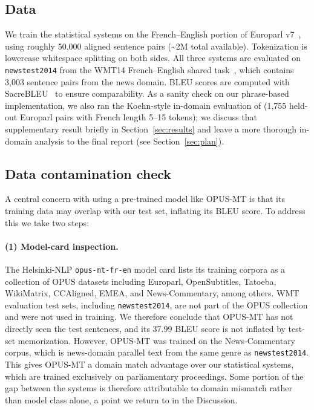 \documentclass[11pt]{article}
\begin{document}
\subsection{Data}
We train the statistical systems on the French--English portion of Europarl v7~\cite{koehn-2005-europarl}, using roughly 50{,}000 aligned sentence pairs (\textasciitilde{}2M total available). Tokenization is lowercase whitespace splitting on both sides. All three systems are evaluated on \texttt{newstest2014} from the WMT14 French--English shared task~\cite{bojar-etal-2014-findings}, which contains 3{,}003 sentence pairs from the news domain. BLEU scores are computed with SacreBLEU~\cite{post-2018-call} to ensure comparability. As a sanity check on our phrase-based implementation, we also ran the Koehn-style in-domain evaluation of \citet{koehn-etal-2003-statistical} (1{,}755 held-out Europarl pairs with French length 5--15 tokens); we discuss that supplementary result briefly in Section~\ref{sec:results} and leave a more thorough in-domain analysis to the final report (see Section~\ref{sec:plan}).
 
\subsection{Data contamination check}
\label{sec:contamination}
 
A central concern with using a pre-trained model like OPUS-MT is that its training data may overlap with our test set, inflating its BLEU score. To address this we take two steps:
 
\paragraph{(1) Model-card inspection.} The Helsinki-NLP \texttt{opus-mt-fr-en} model card lists its training corpora as a collection of OPUS datasets including Europarl, OpenSubtitles, Tatoeba, WikiMatrix, CCAligned, EMEA, and News-Commentary, among others. WMT evaluation test sets, including \texttt{newstest2014}, are not part of the OPUS collection and were not used in training. We therefore conclude that OPUS-MT has not directly seen the test sentences, and its 37.99 BLEU score is not inflated by test-set memorization. However, OPUS-MT was trained on the News-Commentary corpus, which is news-domain parallel text from the same genre as \texttt{newstest2014}. This gives OPUS-MT a domain match advantage over our statistical systems, which are trained exclusively on parliamentary proceedings. Some portion of the gap between the systems is therefore attributable to domain mismatch rather than model class alone, a point we return to in the Discussion.
\end{document}

